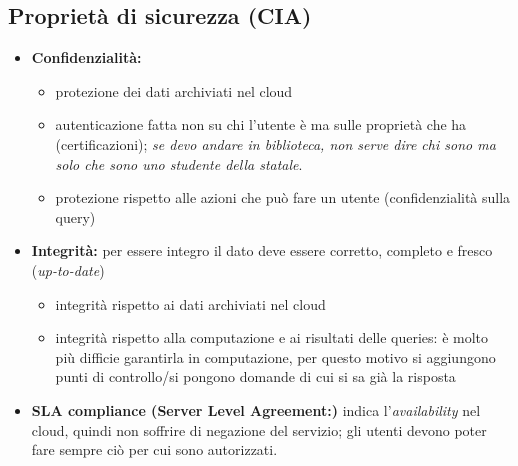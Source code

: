 \documentclass{report}
\begin{document}
\subsection{Proprietà di sicurezza (CIA)}
\begin{itemize}
    \item \textbf{ Confidenzialità:}
    \begin{itemize}
        \item protezione dei dati archiviati nel cloud
        \item autenticazione fatta non su chi l'utente è ma sulle proprietà che ha (certificazioni); \textit{se devo andare in biblioteca, non serve dire chi sono ma solo che
        sono uno studente della statale}.
        \item protezione rispetto alle azioni che può fare un utente (confidenzialità sulla query)
    \end{itemize}
    \item \textbf{Integrità:} per essere integro il dato deve essere corretto, completo e fresco (\textit{up-to-date})
    \begin{itemize}
        \item integrità rispetto ai dati archiviati nel cloud
        \item integrità rispetto alla computazione e ai risultati delle queries: è molto più difficie garantirla in computazione,
        per questo motivo si aggiungono punti di controllo/si pongono domande di cui si sa già la risposta 
    \end{itemize}
    \item \textbf{SLA compliance (Server Level Agreement:)}
    indica l'\textit{availability} nel cloud, quindi non soffrire di negazione del servizio; gli utenti devono poter fare sempre ciò per 
    cui sono autorizzati.
\end{itemize}
\end{document}
